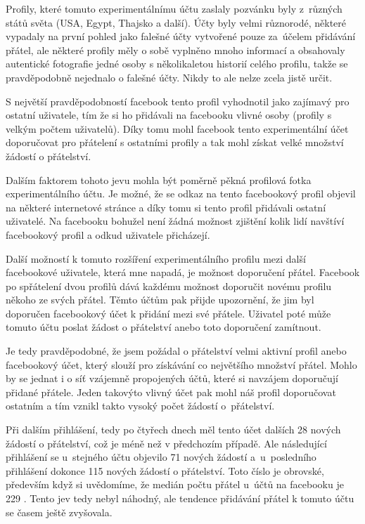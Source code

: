 \documentclass[thesis=M,czech]{FITthesis}[2013/05/10]
\begin{document}
Profily, které tomuto experimentálnímu účtu zaslaly pozvánku byly z~různých států světa (USA, Egypt, Thajsko a další). Účty byly velmi různorodé, některé vypadaly na první pohled jako falešné účty vytvořené pouze za~účelem přidávání přátel, ale některé profily měly o sobě vyplněno mnoho informací a obsahovaly autentické fotografie jedné osoby s několikaletou historií celého profilu, takže se pravděpodobně nejednalo o falešné účty. Nikdy to ale nelze zcela jistě určit. 

S největší pravděpodobností facebook tento profil vyhodnotil jako zajímavý pro ostatní uživatele, tím že si ho přidávali na facebooku vlivné osoby (profily s velkým počtem uživatelů). Díky tomu mohl facebook tento experimentální účet doporučovat pro přátelení s ostatními profily a tak mohl získat velké množství žádostí o přátelství.

Dalším faktorem tohoto jevu mohla být poměrně pěkná profilová fotka experimentálního účtu. Je možné, že se odkaz na tento facebookový profil objevil na některé internetové stránce a díky tomu si tento profil přidávali ostatní uživatelé. Na facebooku bohužel není žádná možnost zjištění kolik lidí navštíví facebookový profil a odkud uživatele přicházejí.

Další možností k tomuto rozšíření experimentálního profilu mezi další facebookové uživatele, která mne napadá, je možnost doporučení přátel. Facebook po spřátelení dvou profilů dává každému možnost doporučit novému profilu někoho ze svých přátel. Těmto účtům pak přijde upozornění, že jim byl doporučen facebookový  účet k přidání mezi své přátele. Uživatel poté může tomuto účtu poslat žádost o přátelství anebo toto doporučení zamítnout. 

Je tedy pravděpodobné, že jsem požádal o přátelství velmi aktivní profil anebo facebookový účet, který slouží pro získávání co největšího množství přátel. Mohlo by se jednat i o síť vzájemně propojených účtů, které si navzájem doporučují přidané přátele. Jeden takovýto vlivný účet pak mohl náš profil doporučovat ostatním a tím vznikl takto vysoký počet žádostí o~přátelství.

Při dalším přihlášení, tedy po čtyřech dnech měl tento účet dalších 28 nových žádostí o přátelství, což je méně než v předchozím případě. Ale následující přihlášení se u~stejného účtu objevilo 71 nových žádostí a~u~posledního přihlášení dokonce 115 nových žádostí o přátelství. Toto číslo je obrovské, především když si uvědomíme, že medián počtu přátel u~účtů na facebooku je 229 \cite{web:fbFriendsMedian}. Tento jev tedy nebyl náhodný, ale tendence přidávání přátel k tomuto účtu se časem ještě zvyšovala.
\end{document}
